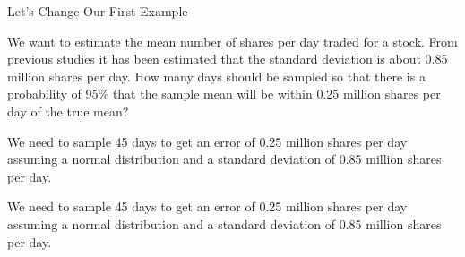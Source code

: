 \begin{frame}{Let's Change Our First Example}

  We want to estimate the mean number of shares per day traded for a
  stock. From previous studies it has been estimated that the standard
  deviation is about 0.85 million shares per day. How many days should
  be sampled so that there is a probability of 95\% that the sample
  mean will be within 0.25 million shares per day of the true mean?

  \vfill

  {

    We need to sample 45 days to get an error of 0.25 million shares
    per day assuming a normal distribution and a standard deviation of
    0.85 million shares per day.

  }

  {

    We need to sample {\color{red}45 days} to get an {\color{red}error of 0.25} million shares
    per day {\color{red}assuming a normal distribution} and a {\color{red}standard deviation of
    0.85} million shares per day.

  }


\end{frame}










